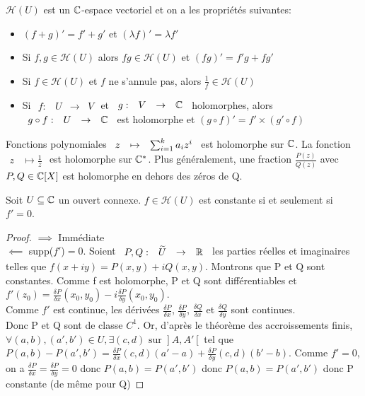 \documentclass[]{report}
\begin{document}
\begin{prop}
    $\mathcal{H}(U)$ est un $\mathbb{C}$-espace vectoriel et on a les propriétés suivantes:\\
    \begin{itemize}
        \item $(f+g)'=f'+g'$ et $(\lambda f)'=\lambda f'$
        \item Si $f,g \in \mathcal{H}(U)$ alors $fg\in \mathcal{H}(U)$ et $(fg)'=f'g+fg'$
        \item Si $f\in \mathcal{H}(U)$ et $f$ ne s'annule pas, alors $\frac{1}{f} \in \mathcal{H}(U)$
        \item Si $\begin{array}{ccccc} f : & U & \to & V \end{array}$ et $\begin{array}{ccccc} g : & V & \to & \mathbb{C} \end{array}$ holomorphes, alors $\begin{array}{ccccc} g \circ f : & U & \to & \mathbb{C} \end{array}$ est holomorphe et $(g \circ f)'=f'\times(g' \circ f)$
    \end{itemize}
\end{prop}

\begin{ex}
    Fonctions polynomiales $\begin{array}{ccccc} z & \mapsto & \sum_{i=1}^{k} a_i z^i \end{array}$ est holomorphe sur $\mathbb{C}$. La fonction $\begin{array}{ccccc}z & \mapsto  \frac{1}{z}\end{array}$ est holomorphe sur $\mathbb{C}^*$. Plus généralement, une fraction $\frac{P(z)}{Q(z)}$ avec $P,Q\in \mathbb{C}[X]$ est holomorphe en dehors des zéros de Q.
\end{ex}

\begin{prop}
    Soit $U\subseteq \mathbb{C}$ un ouvert connexe. $f\in \mathcal{H}(U)$ est constante si et seulement si $f'=0$.
\end{prop}

\begin{proof}
    $\implies$ Immédiate \\
    $\impliedby$ supp($f'$)$=0$. Soient $\begin{array}{ccccc} P,Q : & \widetilde{U} & \to & \mathbb{R} \end{array}$ les parties réelles et imaginaires telles que $f(x+iy)=P(x,y)+iQ(x,y)$. Montrons que P et Q sont constantes. Comme f est holomorphe, P et Q sont différentiables et $f'(z_0)=\frac{\delta P}{\delta x}(x_0,y_0)-i\frac{\delta P}{\delta y}(x_0,y_0)$.\\
    Comme $f'$ est continue, les dérivées $\frac{\delta P}{\delta x}$, $\frac{\delta P}{\delta y}$, $\frac{\delta Q}{\delta x}$ et $\frac{\delta Q}{\delta y}$ sont continues.\\ 
    Donc P et Q sont de classe $C^1$. Or, d'après le théorème des accroissements finis, $\forall(a,b),(a',b')\in U, \exists(c,d)\text{ sur }\left. \right]A,A'\left[ \right.$ tel que\\
    $P(a,b)-P(a',b')=\frac{\delta P}{\delta x}(c,d)(a'-a)+\frac{\delta P}{\delta y}(c,d)(b'-b)$.
    Comme $f'=0$, on a $\frac{\delta P}{\delta x}=\frac{\delta P}{\delta y}=0$ donc $P(a,b)=P(a',b')$ donc $P(a,b)=P(a',b')$ donc P constante (de même pour Q)
\end{proof}
\end{document}
